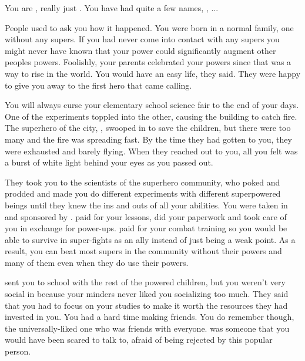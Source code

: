 \documentclass[char]{LRSguildcamp1}
\begin{document}
\name{\cYS{}}

You are \cYS{}, really just \cYS{\intro}. You have had quite a few names, \cYSOldName{}, \cYS{\MYsupername}...

People used to ask you how it happened. You were born in a normal family, one without any supers. If you had never come into contact with any supers you might never have known that your power could significantly augment other peoples powers. Foolishly, your parents celebrated your powers since that was a way to rise in the world. You would have an easy life, they said. They were happy to give you away to the first hero that came calling. 

You will always curse your elementary school science fair to the end of your days. One of the experiments toppled into the other, causing the building to catch fire. The superhero of the city, \cEther{}, swooped in to save the children, but there were too many and the fire was spreading fast. By the time they had gotten to you, they were exhausted and barely flying. When they reached out to you, all you felt was a burst of white light behind your eyes as you passed out. 

They took you to the scientists of the superhero community, who poked and prodded and made you do different experiments with different superpowered beings until they knew the ins and outs of all your abilities. You were taken in and sponsored by \cEther{\them}. \cEther{\They} paid for your lessons, did your paperwork and took care of you in exchange for power-ups. \cEther{\They} paid for your combat training so you would be able to survive in super-fights as an ally instead of just being a weak point. As a result, you can beat most supers in the community without their powers and many of them even when they do use their powers. 

\cEther{\they} sent you to school with the rest of the powered children, but you weren't very social in \pSuperSchool{} because your minders never liked you socializing too much. They said that you had to focus on your studies to make it worth the resources they had invested in you. You had a hard time making friends. You do remember \cYoungest{} though, the universally-liked one who was friends with everyone. \cYoungest{} was someone that you would have been scared to talk to, afraid of being rejected by this popular person.  
\end{document}
